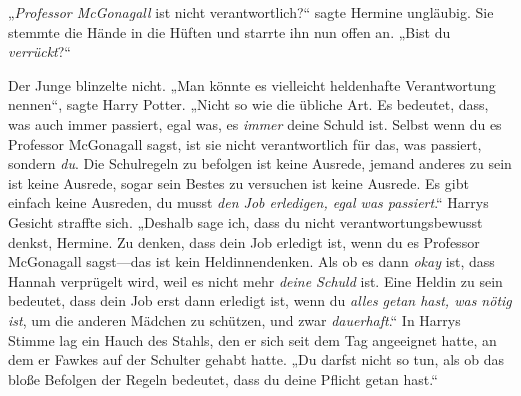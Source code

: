 „\emph{Professor McGonagall} ist nicht verantwortlich?“ sagte Hermine ungläubig. Sie stemmte die Hände in die Hüften und starrte ihn nun offen an. „Bist du \emph{verrückt}?“

Der Junge blinzelte nicht. „Man könnte es vielleicht heldenhafte Verantwortung nennen“, sagte Harry Potter. „Nicht so wie die übliche Art. Es bedeutet, dass, was auch immer passiert, egal was, es \emph{immer} deine Schuld ist. Selbst wenn du es Professor McGonagall sagst, ist sie nicht verantwortlich für das, was passiert, sondern \emph{du}. Die Schulregeln zu befolgen ist keine Ausrede, jemand anderes zu sein ist keine Ausrede, sogar sein Bestes zu versuchen ist keine Ausrede. Es gibt einfach keine Ausreden, du musst \emph{den Job erledigen, egal was passiert}.“ Harrys Gesicht straffte sich. „Deshalb sage ich, dass du nicht verantwortungsbewusst denkst, Hermine. Zu denken, dass dein Job erledigt ist, wenn du es Professor McGonagall sagst—das ist kein Heldinnendenken. Als ob es dann \emph{okay} ist, dass Hannah verprügelt wird, weil es nicht mehr \emph{deine Schuld} ist. Eine Heldin zu sein bedeutet, dass dein Job erst dann erledigt ist, wenn du \emph{alles getan hast, was nötig ist}, um die anderen Mädchen zu schützen, und zwar \emph{dauerhaft}.“ In Harrys Stimme lag ein Hauch des Stahls, den er sich seit dem Tag angeeignet hatte, an dem er Fawkes auf der Schulter gehabt hatte. „Du darfst nicht so tun, als ob das bloße Befolgen der Regeln bedeutet, dass du deine Pflicht getan hast.“

